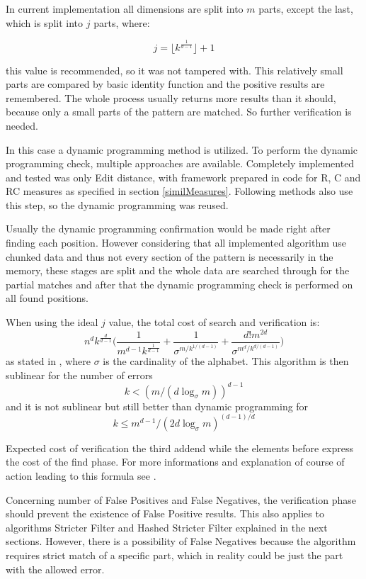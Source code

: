In current implementation all dimensions are split into $m$ parts, except the last, which is split into $j$ parts, where:

$$j = \lfloor k^{\frac{1}{d-1}} \rfloor + 1$$

this value is recommended, so it was not tampered with. This relatively small parts are compared by basic identity function and the positive results are remembered. The whole process usually returns more results than it should, because only a small parts of the pattern are matched. So further verification is needed.

In this case a dynamic programming method is utilized. To perform the dynamic programming check, multiple approaches are available. Completely implemented and tested was only Edit distance, with framework prepared in code for R, C and RC measures as specified in section \ref{similMeasures}. Following methods also use this step, so the dynamic programming was reused.

Usually the dynamic programming confirmation would be made right after finding each position. However considering that all implemented algorithm use chunked data and thus not every section of the pattern is necessarily in the memory, these stages are split and the whole data are searched through for the partial matches and after that the dynamic programming check is performed on all found positions.

When using the ideal $j$ value, the total cost of search and verification is: $$n^dk^{\frac{d}{d-1}}\Big(\frac{1}{m^{d-1}k^{\frac{1}{d-1}}} + \frac{1}{\sigma^{m/k^{1/(d-1)}}} + \frac{d!m^{2d}}{\sigma^{m^d/k^{d/(d-1)}}}\Big)$$ as stated in \cite{mdApproxPM}, where $\sigma$ is the cardinality of the alphabet. This algorithm is then sublinear for the number of errors $$ k < (m/(d \log_\sigma m))^{d-1} $$ and it is not sublinear but still better than dynamic programming for $$k \leq m^{d-1}/(2d\log_\sigma m)^{(d-1)/d} $$

Expected cost of verification the third addend while the elements before express the cost of the find phase. For more informations and explanation of course of action leading to this formula see \cite{mdApproxPM}.

Concerning number of False Positives and False Negatives, the verification phase should prevent the existence of False Positive results. This also applies to algorithms Stricter Filter and Hashed Stricter Filter explained in the next sections. However, there is a possibility of False Negatives because the algorithm requires strict match of a specific part, which in reality could be just the part with the allowed error.

